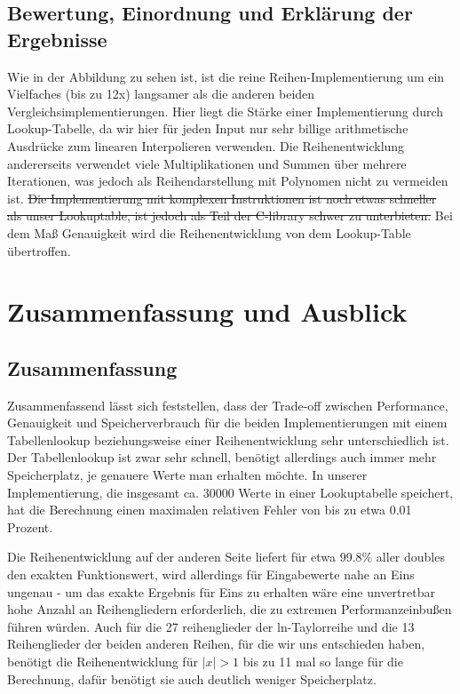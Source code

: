 \documentclass[course=erap] {aspdoc}
\begin{document}
     \subsection{Bewertung, Einordnung und Erklärung der Ergebnisse}
     Wie in der Abbildung zu sehen ist, ist die reine Reihen-Implementierung um ein Vielfaches (bis zu 12x) langsamer als die anderen
     beiden Vergleichsimplementierungen.
     Hier liegt die Stärke einer Implementierung durch Lookup-Tabelle, da wir hier für jeden
     Input nur sehr billige arithmetische Ausdrücke zum linearen Interpolieren verwenden.
     Die Reihenentwicklung andererseits verwendet viele Multiplikationen und Summen über mehrere Iterationen, was jedoch als Reihendarstellung mit Polynomen nicht zu vermeiden ist.
     \sout{Die Implementierung mit komplexen Instruktionen ist noch etwas schneller als unser Lookuptable, ist jedoch als Teil der
     C-library schwer zu unterbieten.} Bei dem Maß Genauigkeit wird die Reihenentwicklung von dem Lookup-Table übertroffen.
 
     \section{Zusammenfassung und Ausblick}
     \subsection{Zusammenfassung}
     Zusammenfassend lässt sich feststellen, dass der Trade-off zwischen Performance, Genauigkeit und Speicherverbrauch für die beiden Implementierungen mit einem Tabellenlookup beziehungsweise einer Reihenentwicklung sehr unterschiedlich ist.
     Der Tabellenlookup ist zwar sehr schnell, benötigt allerdings auch immer mehr Speicherplatz, je genauere Werte man erhalten möchte.
     In unserer Implementierung, die insgesamt ca. 30000 Werte in einer Lookuptabelle speichert, hat die Berechnung einen maximalen relativen Fehler von bis zu etwa 0.01 Prozent.
 
     Die Reihenentwicklung auf der anderen Seite liefert für etwa 99.8\% aller doubles den exakten Funktionswert, wird allerdings für Eingabewerte nahe an Eins ungenau - um das exakte Ergebnis für Eins zu erhalten wäre eine unvertretbar hohe Anzahl an Reihengliedern erforderlich, die zu extremen Performanzeinbußen führen würden.
     Auch für die 27 reihenglieder der ln-Taylorreihe und die 13 Reihenglieder der beiden anderen Reihen, für die wir uns entschieden haben, benötigt die Reihenentwicklung für $|x|>1$ bis zu 11 mal so lange für die Berechnung, dafür benötigt sie auch deutlich weniger Speicherplatz.
 
\end{document}
